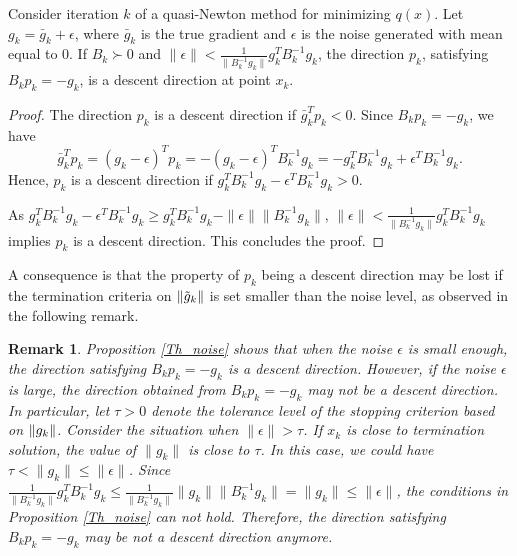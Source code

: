 \documentclass[11pt,twoside]{article}
\newtheorem{remark}{Remark}
\begin{document}
\begin{proposition}\label{Th_noise}
  Consider iteration $k$ of a quasi-Newton method for minimizing
  $q(x)$. Let $g_k = \bar{g}_k +
\epsilon$, where $\bar{g}_k$ is the
  true gradient and $\epsilon$ is the noise generated with mean equal
  to $0$.  If $B_k \succ 0$ and $\|\epsilon\| <
  \frac{1}{\|B_k^{-1}g_k\|}g_k^TB_k^{-1}g_k$, the direction $p_k$,
  satisfying $B_k p_k = -g_k$, is a descent direction at point $x_k$.
\end{proposition}
\begin{proof}
  The direction $p_k$ is a descent direction if $\bar{g}_k^Tp_k < 0$.
  Since $B_k p_k = -g_k$, we have
  \[
  \bar{g}_k^Tp_k = (g_k - \epsilon)^Tp_k = -(g_k - \epsilon)^TB_k^{-1}g_k
  = -g_k^TB_k^{-1}g_k + \epsilon^TB_k^{-1}g_k.
  \]
  Hence, $p_k$ is a descent direction if $ g_k^TB_k^{-1}g_k - \epsilon^TB_k^{-1}g_k > 0 $.

  As $ g_k^TB_k^{-1}g_k - \epsilon^TB_k^{-1}g_k \geq g_k^TB_k^{-1}g_k - \|\epsilon\|\|B_k^{-1}g_k\| $,
  $ \|\epsilon\| < \frac{1}{\|B_k^{-1}g_k\|}g_k^TB_k^{-1}g_k$
  implies $p_k$ is a descent direction.
  This concludes the proof.
\end{proof}

A consequence is that the property of $p_k$ being a descent direction
may be lost if the termination criteria on $\|\tilde{g}_k\|$ is set smaller
  than the noise level, as observed in the following remark.

\begin{remark}\label{Remark_m1}
  Proposition \ref{Th_noise} shows that when the noise $\epsilon$ is
  small enough, the direction satisfying $B_k p_k = -g_k$ is a descent
  direction.  However, if the noise $\epsilon$ is large, the direction
  obtained from $B_k p_k = -g_k$ may not be a descent direction.  In
  particular, let $\tau>0$ denote the tolerance level of the stopping
  criterion based on $\|g_k\|$.  Consider the situation when
  $\|\epsilon\| > \tau$.  If $x_k$ is close to termination solution,
  the value of $\|g_k\|$ is close to $\tau$.  In this case, we could
  have $ \tau < \|g_k\| \leq \|\epsilon\|$.  Since
  $\frac{1}{\|B_k^{-1}g_k\|}g_k^TB_k^{-1}g_k \leq
  \frac{1}{\|B_k^{-1}g_k\|}\|g_k\| \|B_k^{-1}g_k \| = \|g_k\| \leq
  \|\epsilon\|$, the conditions in Proposition \ref{Th_noise} can not
  hold.  Therefore, the direction satisfying $B_k p_k = -g_k$ may be
  not a descent direction anymore.
\end{remark}
\end{document}
